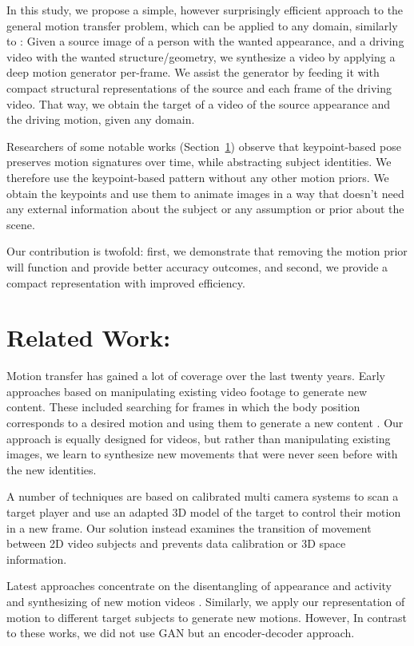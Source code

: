 \documentclass{article}
\begin{document}
In this study, we propose a simple, however surprisingly efficient approach
to the general motion transfer problem, which can be
applied to any domain, similarly to \cite{siarohin2019animating}:
Given a source image of a person with the wanted appearance,
and a driving video with the wanted structure/geometry,
we synthesize a video by applying a deep motion generator per-frame. We
assist the generator by feeding it with compact structural representations
of the source and each frame of the driving video. That way, we obtain the
target of a video of the source appearance and the driving motion, given
any domain.

Researchers of some notable works (Section~\ref{related}) observe that
keypoint-based pose preserves motion signatures over time, while
abstracting subject identities. We therefore use the keypoint-based pattern
without any other motion priors. We obtain the keypoints and use them to
animate images in a way that doesn't need any external information about the
subject or any assumption or prior about the scene.

Our contribution is twofold: first, we demonstrate that removing the motion
prior will function and provide better accuracy outcomes, and second,
we provide a compact representation with improved efficiency.

\medskip

\section{Related Work:}
\label{related}
Motion transfer has gained a lot of coverage over the last twenty years.
Early approaches based on manipulating existing video footage to generate
new content. These included searching for frames in which the body position
corresponds to a desired motion and using them to generate a new
content \cite{bregler1997video}. Our approach is equally designed for videos,
but rather than manipulating existing images, we learn to synthesize new
movements that were never seen before with the new identities.

A number of techniques are based on calibrated multi camera systems to scan
a target player and use an adapted 3D model of the target to control their
motion in a new frame\cite{cheung2004markerless}. Our solution instead
examines the transition of movement between 2D video subjects and prevents
data calibration or 3D space information.

Latest approaches concentrate on the disentangling of appearance and
activity and synthesizing of new motion videos \cite{tulyakov2018mocogan}.
Similarly, we apply our representation of motion to different target
subjects to generate new motions. However, In contrast to these works,
we did not use GAN but an encoder-decoder approach.
\end{document}
